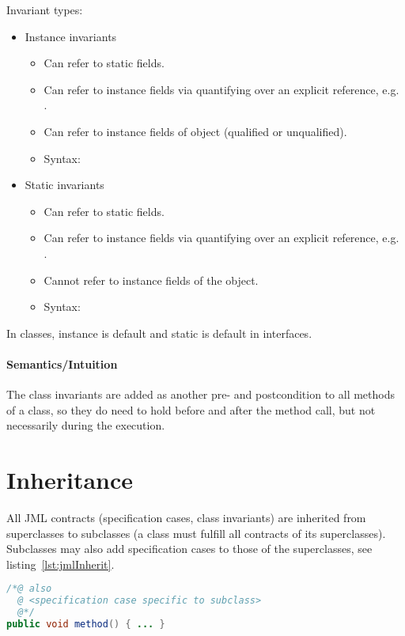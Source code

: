 			Invariant types:
			\begin{itemize}
				\item Instance invariants
					\begin{itemize}
						\item Can refer to static fields.
						\item Can refer to instance fields via quantifying over an explicit reference, e.g. .
						\item Can refer to instance fields of  object (qualified or unqualified).
						\item Syntax: 
					\end{itemize}
				\item Static invariants
					\begin{itemize}
						\item Can refer to static fields.
						\item Can refer to instance fields via quantifying over an explicit reference, e.g. .
						\item Cannot refer to instance fields of the object.
						\item Syntax: 
					\end{itemize}
			\end{itemize}
			In classes, instance is default and static is default in interfaces.

			\paragraph{Semantics/Intuition}
				The class invariants are added as another pre- and postcondition to all methods of a class, so they do need to hold before and after the method call, but not necessarily during the execution.

	\section{Inheritance}
		All JML contracts (specification cases, class invariants) are inherited from superclasses to subclasses (a class must fulfill all contracts of its superclasses). Subclasses may also add specification cases to those of the superclasses, see listing~\ref{lst:jmlInherit}.

		\begin{lstlisting}[caption = { Inheritance in JML }, label = lst:jmlInherit, language = Java]
/*@ also
  @ <specification case specific to subclass>
  @*/
public void method() { ... }
		\end{lstlisting}

